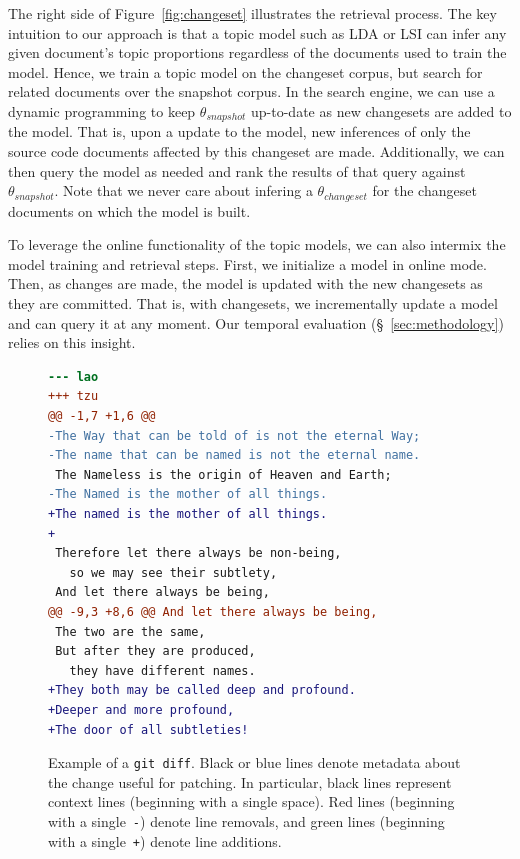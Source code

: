 The right side of Figure~\ref{fig:changeset} illustrates the retrieval process.
The key intuition to our approach is that a topic model such as LDA or LSI
can infer any given document's topic proportions regardless of the documents used to train the model.
Hence, we train a topic model on the changeset corpus,
but search for related documents over the snapshot corpus.
In the search engine, we can use a dynamic programming to
keep $\theta_{snapshot}$ up-to-date as new changesets are added to the model.
That is, upon a update to the model, new inferences of only the source code documents affected by this changeset are made.
Additionally, we can then query the model as needed
and rank the results of that query against $\theta_{snapshot}$.
Note that we never care about infering a $\theta_{changeset}$
for the changeset documents on which the model is built.

To leverage the online functionality of the topic models,
we can also intermix the model training and retrieval steps.
First, we initialize a model in online mode.
Then, as changes are made, the model is updated with the new changesets as they are committed.
That is, with changesets, we incrementally update a model and can query it at any moment.
Our temporal evaluation (\S~\ref{sec:methodology}) relies on this insight.



\begin{figure}[t]
\centering
\footnotesize
\begin{lstlisting}[language=diff, basicstyle=\ttfamily]
--- lao
+++ tzu
@@ -1,7 +1,6 @@
-The Way that can be told of is not the eternal Way;
-The name that can be named is not the eternal name.
 The Nameless is the origin of Heaven and Earth;
-The Named is the mother of all things.
+The named is the mother of all things.
+
 Therefore let there always be non-being,
   so we may see their subtlety,
 And let there always be being,
@@ -9,3 +8,6 @@ And let there always be being,
 The two are the same,
 But after they are produced,
   they have different names.
+They both may be called deep and profound.
+Deeper and more profound,
+The door of all subtleties!
\end{lstlisting}
\caption{Example of a \texttt{git diff}.
Black or blue lines denote metadata about the change useful for patching.
In particular, black lines represent context lines (beginning with a single space).
Red lines (beginning with a single~\texttt{-}) denote line removals,
and green lines (beginning with a single~\texttt{+}) denote line additions.}
\label{fig:diff}
\vspace{-10pt}
\end{figure}

